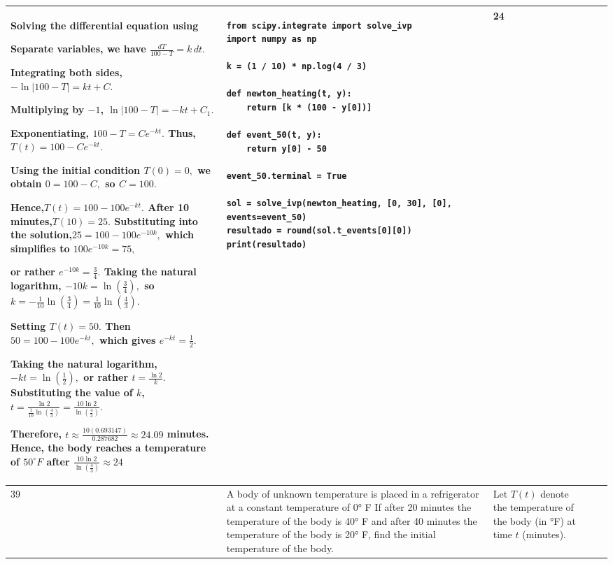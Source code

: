 \documentclass[a4paper,12pt]{article}
\begin{document}
\begin{longtable}{|p{0.3cm}|p{}|p{10cm}|p{}|p{1.5cm}|}
Solving  the differential equation using

Separate  variables, we have $
\frac{dT}{100-T}=k\,dt.
$

Integrating both sides, $-\ln|100-T|=kt+C.$

Multiplying by $-1$, $\ln|100-T|=-kt+C_1.$

Exponentiating, $100-T=Ce^{-kt}.$ Thus, $T(t)=100-Ce^{-kt}.$

Using the initial condition $T(0)=0,$ we obtain $0=100-C,$ so $C=100.$

Hence,$T(t)=100-100e^{-kt}.$ After 10 minutes,$T(10)=25.$ Substituting into the solution,$25=100-100e^{-10k},
$ which simplifies to $100e^{-10k}=75,$

or rather $e^{-10k}=\frac34.$ Taking the natural logarithm, $
-10k=\ln\left(\frac34\right),
$
so $
k=-\frac{1}{10}\ln\left(\frac34\right)
=\frac{1}{10}\ln\left(\frac43\right).
$


Setting $
T(t)=50.
$ Then $
50=100-100e^{-kt},
$ which gives $
e^{-kt}=\frac12.$

Taking the natural logarithm, $
-kt=\ln\left(\frac12\right),
$ or rather $ t=\frac{\ln 2}{k}.$ Substituting the value of $k$, $
t=\frac{\ln 2}{\frac{1}{10}\ln\left(\frac43\right)}
=\frac{10\ln 2}{\ln\left(\frac43\right)}.
$

Therefore, $
t\approx\frac{10(0.693147)}{0.287682}
\approx24.09$ minutes.
Hence, the body reaches a temperature of $50^\circ F $ after $
{\frac{10\ln 2}{\ln\left(\frac43\right)}\approx24}	
$

            &\begin{verbatim}
from scipy.integrate import solve_ivp
import numpy as np

k = (1 / 10) * np.log(4 / 3)

def newton_heating(t, y):
    return [k * (100 - y[0])]

def event_50(t, y):
    return y[0] - 50

event_50.terminal = True

sol = solve_ivp(newton_heating, [0, 30], [0], events=event_50)
resultado = round(sol.t_events[0][0])
print(resultado)
\end{verbatim} &   24               \\ \hline
    39             & A body of unknown temperature is placed in a refrigerator at a constant temperature of 0° F If after 20 minutes the temperature of the body is 40° F and after 40 minutes the temperature of the body is 20° F, find the initial temperature of the body.               & 
               Let $T(t)$ denote the temperature of the body (in °F) at time $t$ (minutes).


\end{longtable}
\end{document}
